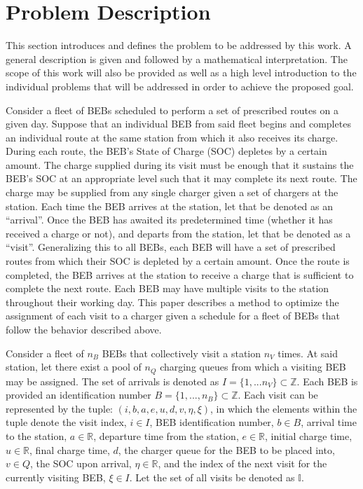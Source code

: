 \documentclass[11pt,a4paper,final]{article}
\newcommand{\visit}{(i, b, a, e, u, d, v, \eta, \xi)}
\newcommand{\I}{\mathbb{I}}                 %
\newcommand{\Iset}{I}                       %
\begin{document}
\section{Problem Description}
\label{sec:problem-description}
This section introduces and defines the problem to be addressed by this work. A general description is given and
followed by a mathematical interpretation. The scope of this work will also be provided as well as a high level
introduction to the individual problems that will be addressed in order to achieve the proposed goal.

Consider a fleet of BEBs scheduled to perform a set of prescribed routes on a given day. Suppose that an individual BEB
from said fleet begins and completes an individual route at the same station from which it also receives its charge.
During each route, the BEB's State of Charge (SOC) depletes by a certain amount. The charge supplied during its visit
must be enough that it sustains the BEB's SOC at an appropriate level such that it may complete its next route. The
charge may be supplied from any single charger given a set of chargers at the station. Each time the BEB arrives at the
station, let that be denoted as an ``arrival''. Once the BEB has awaited its predetermined time (whether it has received a
charge or not), and departs from the station, let that be denoted as a ``visit''. Generalizing this to all BEBs, each BEB
will have a set of prescribed routes from which their SOC is depleted by a certain amount. Once the route is completed,
the BEB arrives at the station to receive a charge that is sufficient to complete the next route. Each BEB may have
multiple visits to the station throughout their working day. This paper describes a method to optimize the assignment of
each visit to a charger given a schedule for a fleet of BEBs that follow the behavior described above.

Consider a fleet of \(n_B\) BEBs that collectively visit a station \(n_V\) times. At said station, let there exist a pool of
\(n_Q\) charging queues from which a visiting BEB may be assigned. The set of arrivals is denoted as \(\Iset = \{ 1, ...
n_V \} \subset \mathbb{Z}\). Each BEB is provided an identification number \(B = \{ 1, ..., n_B \} \subset \mathbb{Z}\). Each visit can be represented by
the tuple: \(\visit\), in which the elements within the tuple denote the visit index, \(i \in I\), BEB identification number,
\(b \in B\), arrival time to the station, \(a \in \mathbb{R}\), departure time from the station, \(e \in \mathbb{R}\), initial charge time, \(u \in \mathbb{R}\),
final charge time, \(d\), the charger queue for the BEB to be placed into, \(v \in Q\), the SOC upon arrival, \(\eta \in \mathbb{R}\), and the
index of the next visit for the currently visiting BEB, \(\xi \in I\). Let the set of all visits be denoted as \(\I\).
\end{document}
